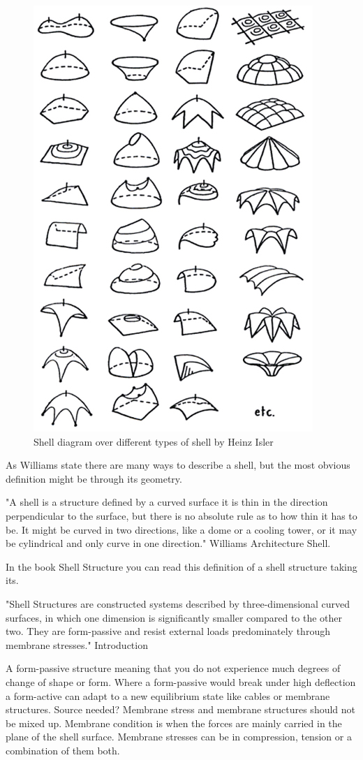 \begin{figure}[H]
\centering
\includegraphics[width=0.6\linewidth ]{figure/Introduction/ShellDiagram.jpg}
\caption{Shell diagram over different types of shell by Heinz Isler}
\end{figure}

As Williams state there are many ways to describe a shell, but the most obvious definition might be through its geometry.

"A shell is a structure defined by a curved surface it is thin in the direction perpendicular to the surface, but there is no absolute rule as to how thin it has to be. It might be curved in two directions, like a dome or a cooling tower, or it may be cylindrical and only curve in one direction." Williams Architecture Shell.

In the book Shell Structure you can read this definition of a shell structure taking its.

"Shell Structures are constructed systems described by three-dimensional curved surfaces, in which one dimension is significantly smaller compared to the other two. They are form-passive and resist external loads predominately through membrane stresses." Introduction 

A form-passive structure meaning that you do not experience much degrees of change of shape or form. Where a form-passive would break under high deflection a form-active can adapt to a new equilibrium state like cables or membrane structures. Source needed? 
Membrane stress and membrane structures should not be mixed up. Membrane condition is when the forces are mainly carried in the plane of the shell surface. Membrane stresses can be in compression, tension or a combination of them both. \\



